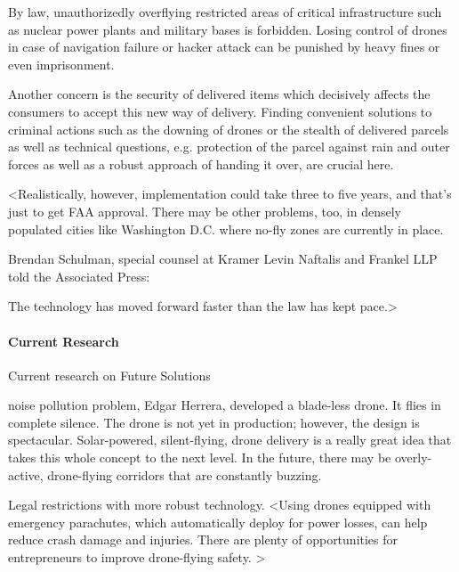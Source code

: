 By law, unauthorizedly overflying restricted areas of critical infrastructure 
such as nuclear power plants
and military bases is forbidden.
Losing control of drones in case of navigation failure or hacker attack
can be punished by heavy fines or even imprisonment.

Another concern is the security of delivered items
which decisively affects the consumers to accept this new way of delivery.
Finding convenient solutions to criminal actions such as the downing of drones 
or the stealth of delivered parcels as well as 
technical questions, e.g. protection of the parcel against rain and outer forces
as well as a robust approach of handing it over, are crucial here.


<Realistically, however, implementation could take three to five years, and that’s just to get FAA approval. There may be other problems, too, in densely populated cities like Washington D.C. where no-fly zones are currently in place.

Brendan Schulman, special counsel at Kramer Levin Naftalis and Frankel LLP told the Associated Press:

    The technology has moved forward faster than the law has kept pace.>


\paragraph{Current Research}
Current research on Future Solutions


noise pollution problem, 
Edgar Herrera, developed a blade-less drone. 
It flies in complete silence. 
The drone is not yet in production; 
however, the design is spectacular. 
Solar-powered, silent-flying, drone delivery is a really great idea that takes this whole concept to the next level.
In the future, there may be overly-active, 
drone-flying corridors that are constantly buzzing. 


Legal restrictions with more robust technology.
<Using drones equipped with emergency parachutes, 
which automatically deploy for power losses, 
can help reduce crash damage and injuries. 
There are plenty of opportunities for entrepreneurs to improve drone-flying safety. >


